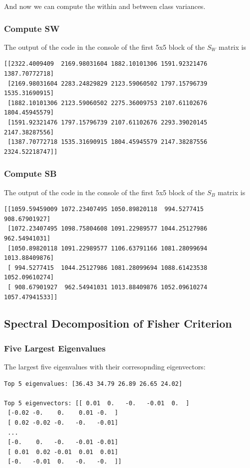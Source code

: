 \documentclass[12pt]{article}
\begin{document}
And now we can compute the within and between class variances.

\subsubsection{Compute SW}

The output of the code in the console of the first 5x5 block of the $S_W$ matrix is
\begin{lstlisting}
[[2322.4009409  2169.98031604 1882.10101306 1591.92321476 1387.70772718]
 [2169.98031604 2283.24829829 2123.59060502 1797.15796739 1535.31690915]
 [1882.10101306 2123.59060502 2275.36009753 2107.61102676 1804.45945579]
 [1591.92321476 1797.15796739 2107.61102676 2293.39020145 2147.38287556]
 [1387.70772718 1535.31690915 1804.45945579 2147.38287556 2324.52218747]]
\end{lstlisting}

\subsubsection{Compute SB}
The output of the code in the console of the first 5x5 block of the $S_B$ matrix is
\begin{lstlisting}
[[1059.59459009 1072.23407495 1050.89820118  994.5277415   908.67901927]
 [1072.23407495 1098.75804608 1091.22989577 1044.25127986  962.54941031]
 [1050.89820118 1091.22989577 1106.63791166 1081.28099694 1013.88409876]
 [ 994.5277415  1044.25127986 1081.28099694 1088.61423538 1052.09610274]
 [ 908.67901927  962.54941031 1013.88409876 1052.09610274 1057.47941533]]
\end{lstlisting}

\subsection{Spectral Decomposition of Fisher Criterion}

\subsubsection{Five Largest Eigenvalues}

The largest five eigenvalues with their corresopnding eigenvectors:
\begin{lstlisting}
Top 5 eigenvalues: [36.43 34.79 26.89 26.65 24.02]

Top 5 eigenvectors: [[ 0.01  0.   -0.   -0.01  0.  ]
 [-0.02 -0.    0.    0.01 -0.  ]
 [ 0.02 -0.02 -0.   -0.   -0.01]
 ...
 [-0.    0.   -0.   -0.01 -0.01]
 [ 0.01  0.02 -0.01  0.01  0.01]
 [-0.   -0.01  0.   -0.   -0.  ]]
\end{lstlisting}
\end{document}
